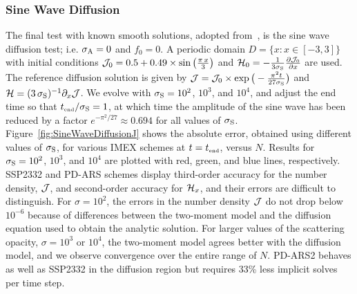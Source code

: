 \subsubsection{Sine Wave Diffusion}

The final test with known smooth solutions, adopted from~\cite{radice_etal_2013}, is the sine wave diffusion test; i.e. $\sigma_{{\rm A}} = 0$ and $f_0 = 0$.
A periodic domain $D=\{x:x\in[-3,3]\}$ with initial conditions $\mathcal{J}_{0} = 0.5+0.49\times\sin\big(\frac{\pi\,x}{3}\big)$ and $\mathcal{H}_{0} =-\frac{1}{3\sigma_{{\rm S}}}\frac{\partial \mathcal{J}_{0}}{\partial x}$ are used.  
The reference diffusion solution is given by $\mathcal{J} = \mathcal{J}_{0} \times \exp\big(-\frac{\pi^2 t}{27\sigma_{{\rm S}}}\big)$ and $\mathcal{H} = (3\,\sigma_{{\rm S}})^{-1}\partial_{x}{\mathcal{J}}$.  
We evolve with $\sigma_{{\rm S}}=10^{2}$, $10^{3}$, and $10^{4}$, and adjust the end time so that $t_{\mbox{\tiny end}}/\sigma_{{\rm S}}=1$, 
at which time the amplitude of the sine wave has been reduced by a factor $e^{-\pi^{2}/27}\approx0.694$ for all values of $\sigma_{{\rm S}}$. 
Figure~\ref{fig:SineWaveDiffusionJ} shows the absolute error, obtained using different values of $\sigma_{{\rm S}}$, for various IMEX schemes at $t=t_{\mbox{\tiny end}}$, versus $N$. 
Results for $\sigma_{{\rm S}}=10^{2}$, $10^{3}$, and $10^{4}$ are plotted with red, green, and blue lines, respectively.
SSP2332 and PD-ARS schemes display third-order accuracy for the number density, $\mathcal{J}$, and second-order accuracy for $\mathcal{H}_{x}$, and their errors are difficult to distinguish.
For $\sigma=10^{2}$, the errors in the number density $\mathcal{J}$ do not drop below $10^{-6}$ because of differences between the two-moment model and the diffusion equation used to obtain the analytic solution.
For larger values of the scattering opacity, $\sigma=10^{3}$ or $10^{4}$, the two-moment model agrees better with the diffusion model, and we observe convergence over the entire range of $N$.
PD-ARS2 behaves as well as SSP2332 in the diffusion region but requires 33\% less implicit solves per time step.  

